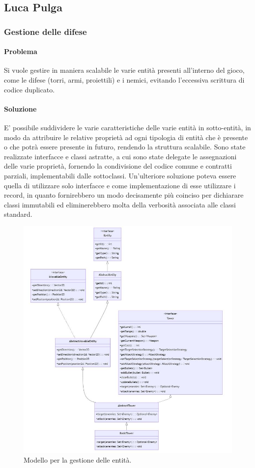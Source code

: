 \documentclass[a4paper,12pt]{report}
\begin{document}
\newpage
\subsection{Luca Pulga}
\subsubsection{Gestione delle difese}
\paragraph{Problema}
Si vuole gestire in maniera scalabile le varie entità presenti all'interno del gioco, come le difese (torri, armi, proiettili) e i nemici, evitando l'eccessiva scrittura di codice duplicato.

\paragraph{Soluzione}
E' possibile suddividere le varie caratteristiche delle varie entità in sotto-entità, in modo da attribuire le relative proprietà ad ogni tipologia di entità che è presente
o che potrà essere presente in futuro, rendendo la struttura scalabile. Sono state realizzate interfacce e classi astratte, a cui sono state delegate le assegnazioni delle varie proprietà, fornendo la condivisione del codice comune e contratti parziali, implementabili dalle sottoclassi.
Un'ulteriore soluzione poteva essere quella di utilizzare solo interfacce e come implementazione di esse utilizzare i record, in quanto fornirebbero un modo decisamente più coinciso per dichiarare classi immutabili ed eliminerebbero molta della verbosità associata alle classi standard.

\begin{figure}[H]
    \centering
    \includegraphics[width=1.2\linewidth]{defense_model}
    \caption{Modello per la gestione delle entità.}
    \label{fig:defense_model}
\end{figure}
\end{document}
